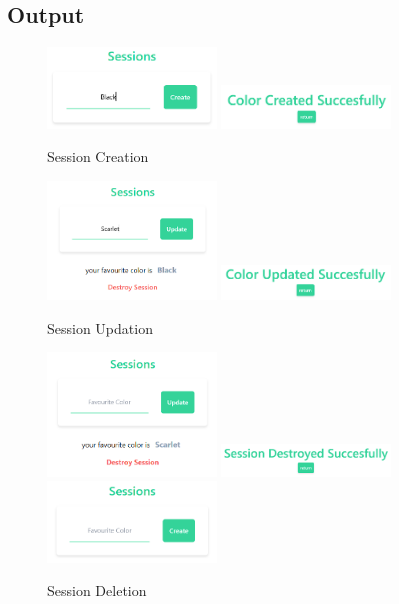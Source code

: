 \documentclass{article}
\begin{document}
\subsection{Output}
\begin{figure}[h!]
	\centering
  \caption{Session Creation}
	\includegraphics[width=0.4\textwidth]{./Assets/p2801.png}
	\includegraphics[width=0.4\textwidth]{./Assets/p2802.png}
\end{figure}
\begin{figure}[h!]
	\centering
  \caption{Session Updation}
	\includegraphics[width=0.4\textwidth]{./Assets/p2803.png}
	\includegraphics[width=0.4\textwidth]{./Assets/p2804.png}
\end{figure}
\begin{figure}[h!]
	\centering
  \caption{Session Deletion}
	\includegraphics[width=0.4\textwidth]{./Assets/p2805.png}
	\includegraphics[width=0.4\textwidth]{./Assets/p2806.png}
	\includegraphics[width=0.4\textwidth]{./Assets/p2807.png}
\end{figure}
\newpage
\end{document}
